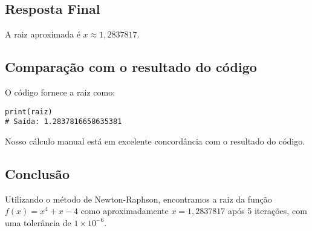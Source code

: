 \documentclass{article}
\begin{document}
\subsection*{Resposta Final}

A raiz aproximada é \( x \approx 1{,}2837817 \).

\subsection*{Comparação com o resultado do código}

O código fornece a raiz como:

\begin{verbatim}
print(raiz)
# Saída: 1.2837816658635381
\end{verbatim}

Nosso cálculo manual está em excelente concordância com o resultado do código.

\subsection*{Conclusão}

Utilizando o método de Newton-Raphson, encontramos a raiz da função \( f(x) = x^4 + x - 4 \) como aproximadamente \( x = 1{,}2837817 \) após 5 iterações, com uma tolerância de \( 1 \times 10^{-6} \).
\end{document}

